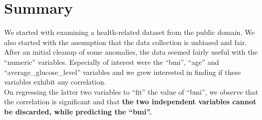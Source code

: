 \documentclass{article}
\begin{document}
\pagebreak

\section*{Summary}
We started with examining a health-related dataset from the 
public domain. We also started with the assumption
that the data collection is unbiased and fair.\\
After an initial cleanup of some anomalies, the data
seemed fairly useful with the ``numeric'' variables.
Especially of interest were the ``bmi'', ``age''
and ``average\_glucose\_level'' variables and we grew 
interested in finding if these variables exhibit any correlation.\\
On regressing the latter two variables to ``fit'' the value of 
``bmi'', we observe that the correlation is significant
and that \textbf{the two independent variables 
cannot be discarded, while predicting the ``bmi''.}
\pagebreak

\printbibliography
\end{document}
